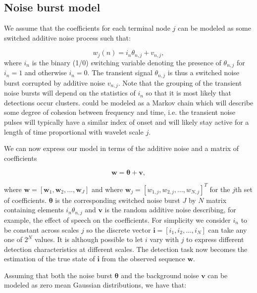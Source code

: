 \subsection{Noise burst model}
We assume that the coefficients for each terminal node $j$ can be modeled as some switched additive noise process such that:

\begin{equation}\label{eq:model1}
    w_{j}(n) = i_{n} \theta_{n,j} + v_{n,j},
\end{equation}
where $i_{n}$ is the binary (1/0) switching variable denoting the presence of $\theta_{n,j}$ for $i_{n} = 1$ and otherwise $i_{n} = 0$. The transient signal $\theta_{n,j}$ is thus a switched noise burst corrupted by additive noise $v_{n,j}$.
Note that the grouping of the transient noise bursts will depend on the statistics of $i_{n}$ so that it is most likely that detections occur clusters. could be modeled as a Markov chain which will describe some degree of cohesion between frequency and time, i.e. the transient noise pulses will typically have a similar index of onset and will likely stay active for a length of time proportional with wavelet scale $j$.

We can now express our model in terms of the additive noise and a matrix of coefficients

\begin{equation}\label{eq:model2}
\boldsymbol{w} = \boldsymbol{\theta} + \boldsymbol{v},
\end{equation}

where $\boldsymbol{w} = [\boldsymbol{w}_1,\boldsymbol{w}_2,\ldots,\boldsymbol{w}_J]$ and where $\boldsymbol{w}_j = [w_{1,j}, w_{2,j}, \ldots, w_{N,j}]^T$ for the $j$th set of coefficients. $\boldsymbol{\theta}$ is the corresponding switched noise burst $J$ by $N$ matrix containing elements $i_{n}\theta_{n,j}$ and $\boldsymbol{v}$ is the random additive noise describing, for example, the effect of speech on the coefficients. For simplicity we consider $i_{n}$ to be constant across scales $j$ so the discrete vector $\boldsymbol{i} = [i_{1}, i_{2}, \ldots, i_{N}]$ can take any one of $2^{N}$ values. It is although possible to let $i$ vary with $j$ to express different detection characteristics at different scales. The detection task now becomes the estimation of the true state of $\boldsymbol{i}$ from the observed sequence $\boldsymbol{w}$.

Assuming that both the noise burst $\boldsymbol{\theta}$ and the background noise $\boldsymbol{v}$ can be modeled as zero mean Gaussian distributions, we have that:

